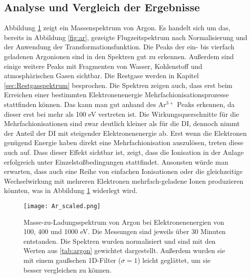 \subsection{Analyse und Vergleich der Ergebnisse}
\label{sec:Analyse}
Abbildung \ref{fig:ar_scaled} zeigt ein Massenspektrum von Argon. Es handelt sich um das, bereits in Abbildung \ref{fig:ar}, gezeigte Flugzeitspektrum nach Normalisierung und der Anwendung der Transformationsfunktion. Die Peaks der ein- bis vierfach geladenen Argonionen sind in den Spektren gut zu erkennen. Außerdem sind einige weitere Peaks mit Fragmenten von Wasser, Kohlenstoff und atmosphärischen Gasen sichtbar. Die Restgase werden in Kapitel \ref{sec:Restgasspektrum} besprochen. Die Spektren zeigen auch, dass erst beim Erreichen einer bestimmten Elektronenenergie Mehrfachionisationsprozesse stattfinden können. Das kann man gut anhand des Ar$^{3+}$ Peaks erkennen, da dieser erst bei mehr als 100 eV vertreten ist. Die Wirkungsquerschnitte für die Mehrfachionisationen sind zwar deutlich kleiner als für die DI, dennoch nimmt der Anteil der DI mit steigender Elektronenenergie ab. Erst wenn die Elektronen genügend Energie haben direkt eine Mehrfachionisation auszulösen, treten diese auch auf. Dass dieser Effekt sichtbar ist, zeigt, dass die Ionisation in der Anlage erfolgreich unter Einzelstoßbedingungen stattfindet. Ansonsten würde man erwarten, dass auch eine Reihe von einfachen Ionisationen oder die gleichzeitige Wechselwirkung mit mehreren Elektronen mehrfach-geladene Ionen produzieren könnten, was in Abbildung \ref{fig:ar_scaled} widerlegt wird. 

\begin{landscape}
    \begin{figure}
        \vspace*{-1.5cm}
        \centering
            \hspace*{-3cm}\texttt{[image: Ar\_scaled.png]}
            \caption[Skaliertes Massenspektrum von Argon bei verschiedenen Elektronenenergien]{Masse-zu-Ladungsspektrum von Argon bei Elektronenenergien von 100, 400 und 1000 eV. Die Messungen sind jeweils über 30 Minuten entstanden. Die Spektren wurden normalisiert und sind mit den Werten aus \ref{tab:argon} gewichtet dargestellt. Außerdem wurden sie mit einem gaußschen 1D-Filter ($\sigma = 1$) leicht geglättet, um sie besser vergleichen zu können.}
            \label{fig:ar_scaled}
    \end{figure}
\end{landscape}

